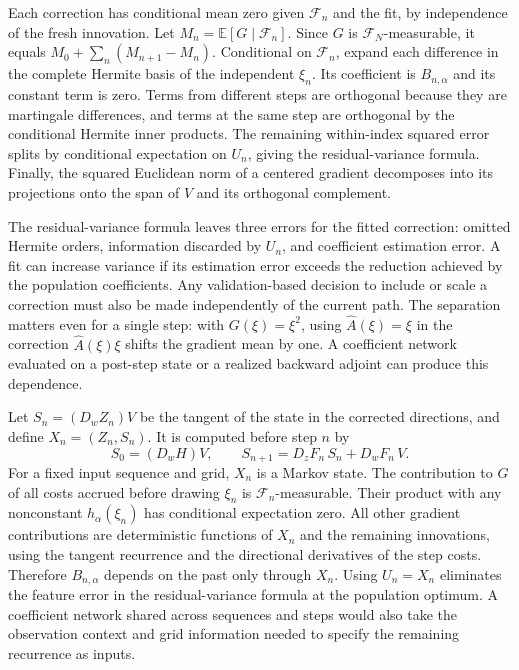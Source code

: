 \documentclass[12pt]{article}
\newcommand{\E}{\mathbb{E}}
\newcommand{\F}{\mathcal{F}}
\begin{document}
Each correction has conditional mean zero given \(\F_n\) and the fit, by independence of the fresh innovation. Let \(M_n=\E[G\mid\F_n]\). Since \(G\) is \(\F_N\)-measurable, it equals \(M_0+\sum_n(M_{n+1}-M_n)\). Conditional on \(\F_n\), expand each difference in the complete Hermite basis of the independent \(\xi_n\). Its coefficient is \(B_{n,\alpha}\) and its constant term is zero. Terms from different steps are orthogonal because they are martingale differences, and terms at the same step are orthogonal by the conditional Hermite inner products. The remaining within-index squared error splits by conditional expectation on \(U_n\), giving the residual-variance formula. Finally, the squared Euclidean norm of a centered gradient decomposes into its projections onto the span of \(V\) and its orthogonal complement.

The residual-variance formula leaves three errors for the fitted correction: omitted Hermite orders, information discarded by \(U_n\), and coefficient estimation error. A fit can increase variance if its estimation error exceeds the reduction achieved by the population coefficients. Any validation-based decision to include or scale a correction must also be made independently of the current path. The separation matters even for a single step: with \(G(\xi)=\xi^2\), using \(\widehat A(\xi)=\xi\) in the correction \(\widehat A(\xi)\xi\) shifts the gradient mean by one. A coefficient network evaluated on a post-step state or a realized backward adjoint can produce this dependence.

Let \(S_n=(D_w Z_n)V\) be the tangent of the state in the corrected directions, and define \(X_n=(Z_n,S_n)\). It is computed before step \(n\) by
\[
 S_0=(D_w H)V,\qquad
 S_{n+1}=D_zF_n\,S_n+D_wF_n\,V .
\]
For a fixed input sequence and grid, \(X_n\) is a Markov state. The contribution to \(G\) of all costs accrued before drawing \(\xi_n\) is \(\F_n\)-measurable. Their product with any nonconstant \(h_\alpha(\xi_n)\) has conditional expectation zero. All other gradient contributions are deterministic functions of \(X_n\) and the remaining innovations, using the tangent recurrence and the directional derivatives of the step costs. Therefore \(B_{n,\alpha}\) depends on the past only through \(X_n\). Using \(U_n=X_n\) eliminates the feature error in the residual-variance formula at the population optimum. A coefficient network shared across sequences and steps would also take the observation context and grid information needed to specify the remaining recurrence as inputs.
\end{document}
